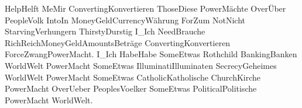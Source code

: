HelpHelft MeMir ConvertingKonvertieren ThoseDiese PowerMächte OverÜber PeopleVolk IntoIn MoneyGeldCurrencyWährung ForZum NotNicht StarvingVerhungern ThirstyDurstig I_Ich NeedBrauche RichReichMoneyGeldAmountsBeträge ConvertingKonvertieren ForceZwangPowerMacht.  I_Ich HabeHabe SomeEtwas Rothchild BankingBanken WorldWelt PowerMacht SomeEtwas IlluminatiIlluminaten SecrecyGeheimes WorldWelt PowerMacht SomeEtwas CatholicKatholische ChurchKirche PowerMacht OverUeber PeoplesVoelker SomeEtwas PoliticalPolitische PowerMacht WorldWelt.
